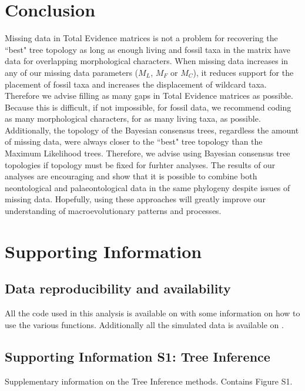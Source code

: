 \documentclass[10pt,letterpaper]{article}
\begin{document}
\section*{Conclusion}
Missing data in Total Evidence matrices is not a problem for recovering the ``best" tree topology as long as enough living and fossil taxa in the matrix have data for overlapping morphological characters. When missing data increases in any of our missing data parameters ($M_{L}$, $M_{F}$ or $M_{C}$), it reduces support for the placement of fossil taxa and increases the displacement of wildcard taxa. Therefore we advise filling as many gaps in Total Evidence matrices as possible. Because this is difficult, if not impossible, for fossil data, we recommend coding as many morphological characters, for as many living taxa, as possible. Additionally, the topology of the Bayesian consensus trees, regardless the amount of missing data, were always closer to the ``best" tree topology than the Maximum Likelihood trees. Therefore, we advise using Bayesian consensus tree topologies if topology must be fixed for furhter analyses. The results of our analyses are encouraging and show that it is possible to combine both neontological and palaeontological data in the same phylogeny despite issues of missing data. Hopefully, using these approaches will greatly improve our understanding of macroevolutionary patterns and processes.

\section*{Supporting Information}


\subsection*{Data reproducibility and availability}
 All the code used in this analysis is available on \href{https://github.com/TGuillerme/Total_Evidence_Method-Missing_data}{\color{blue}{GitHub}} with some information on how to use the various functions. Additionally all the simulated data is available on \href{http://figshare.com/articles/Effect_of_missing_data_on_topological_inference_using_a_total_evidence_approach/1306861}{\color{blue}{FigShare}}.

\subsection*{Supporting Information S1: Tree Inference}
\label{S1_Appendix1}
 Supplementary information on the Tree Inference methods. Contains Figure S1.
\end{document}
